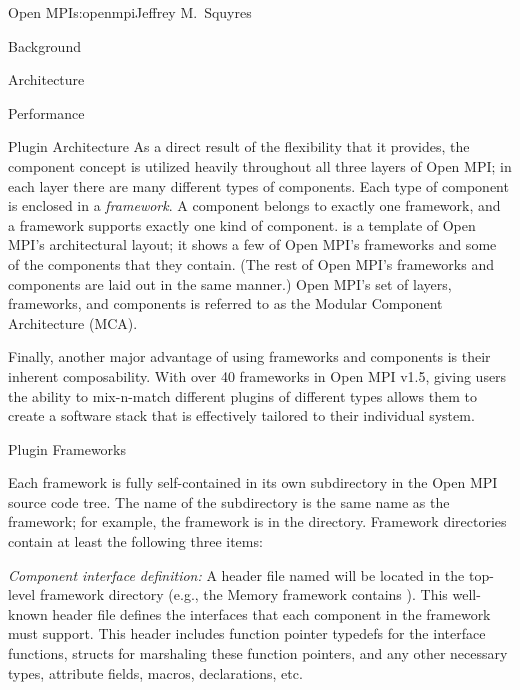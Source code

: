 \begin{aosachapter}{Open MPI}{s:openmpi}{Jeffrey M.\ Squyres}
\begin{aosasect1}{Background}
\begin{aosasect1}{Architecture}
\begin{aosasect2}{Performance}
\begin{aosasect2}{Plugin Architecture}
As a direct result of the flexibility that it provides, the component
concept is utilized heavily throughout all three layers of Open MPI;
in each layer there are many different types of components.
%
Each type of component is enclosed in a \emph{framework}.
%
A component belongs to exactly one framework, and a framework supports
exactly one kind of component.
%
 is a template of Open MPI's architectural
layout; it shows a few of Open MPI's frameworks and some of the
components that they contain.  (The rest of Open MPI's frameworks and
components are laid out in the same manner.)
%
Open MPI's set of layers, frameworks, and components is referred to as
the Modular Component Architecture (MCA).


Finally, another major advantage of using frameworks and components is
their inherent composability.  With over 40 frameworks in Open MPI
v1.5, giving users the ability to mix-n-match different plugins of
different types allows them to create a software stack that is
effectively tailored to their individual system.

\end{aosasect2}


\begin{aosasect2}{Plugin Frameworks}

Each framework is fully self-contained in its own subdirectory in the
Open MPI source code tree.  The name of the subdirectory is the same
name as the framework; for example, the  framework is in
the  directory.  
%
Framework directories contain at least the following three items:

\begin{aosaenumerate}
\item \emph{Component interface definition:} A header file named 
 will be located in the top-level framework
  directory (e.g., the Memory framework contains 
  ).  This well-known header file defines the
  interfaces that each component in the framework must support.  This
  header includes function pointer typedefs for the interface
  functions, structs for marshaling these function pointers, and any
  other necessary types, attribute fields, macros, declarations, etc.


\end{aosaenumerate}
\end{aosasect2}
\end{aosasect2}
\end{aosasect1}
\end{aosasect1}
\end{aosachapter}

